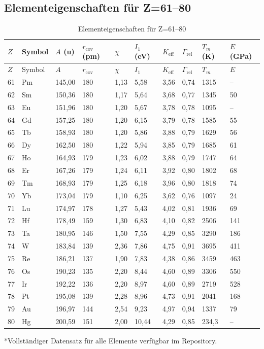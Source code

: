 \documentclass[12pt,a4paper]{article}
\newcommand{\Keff}{K_{\mathrm{eff}}}
\begin{document}
	\subsection*{Elementeigenschaften für Z=61–80}
	
	\begin{longtable}{p{0.6cm}p{1.2cm}p{1.2cm}p{1.2cm}p{1.2cm}p{1.2cm}p{1.5cm}p{1.2cm}p{1.2cm}p{1.2cm}}
		\caption{Elementeigenschaften für Z=61–80} \label{tab:elem-data-61to80} \\
		\toprule
		\(Z\) & Symbol & \(A\) (u) & \(r_{\text{cov}}\) (pm) & \(\chi\) & \(I_1\) (eV) & \(\Keff\) & \(\Gamma_{\text{rel}}\) & \(T_m\) (K) & \(E\) (GPa) \\
		\midrule
		\endfirsthead
		\toprule
		\(Z\) & Symbol & \(A\) & \(r_{\text{cov}}\) & \(\chi\) & \(I_1\) & \(\Keff\) & \(\Gamma_{\text{rel}}\) & \(T_m\) & \(E\) \\
		\midrule
		\endhead
		61 & Pm & 145,00 & 180 & 1,13 & 5,58 & 3,56 & 0,74 & 1315 & – \\
		62 & Sm & 150,36 & 180 & 1,17 & 5,64 & 3,68 & 0,77 & 1345 & 50 \\
		63 & Eu & 151,96 & 180 & 1,20 & 5,67 & 3,78 & 0,78 & 1095 & – \\
		64 & Gd & 157,25 & 180 & 1,20 & 6,15 & 3,79 & 0,78 & 1585 & 55 \\
		65 & Tb & 158,93 & 180 & 1,20 & 5,86 & 3,88 & 0,79 & 1629 & 56 \\
		66 & Dy & 162,50 & 180 & 1,22 & 5,94 & 3,85 & 0,79 & 1685 & 61 \\
		67 & Ho & 164,93 & 179 & 1,23 & 6,02 & 3,88 & 0,79 & 1747 & 64 \\
		68 & Er & 167,26 & 179 & 1,24 & 6,11 & 3,92 & 0,80 & 1802 & 68 \\
		69 & Tm & 168,93 & 179 & 1,25 & 6,18 & 3,96 & 0,80 & 1818 & 74 \\
		70 & Yb & 173,04 & 179 & 1,10 & 6,25 & 3,62 & 0,76 & 1097 & 24 \\
		71 & Lu & 174,97 & 178 & 1,27 & 5,43 & 4,02 & 0,81 & 1936 & 69 \\
		72 & Hf & 178,49 & 159 & 1,30 & 6,83 & 4,10 & 0,82 & 2506 & 141 \\
		73 & Ta & 180,95 & 146 & 1,50 & 7,55 & 4,29 & 0,85 & 3290 & 186 \\
		74 & W  & 183,84 & 139 & 2,36 & 7,86 & 4,75 & 0,91 & 3695 & 411 \\
		75 & Re & 186,21 & 137 & 1,90 & 7,83 & 4,38 & 0,86 & 3459 & 463 \\
		76 & Os & 190,23 & 135 & 2,20 & 8,44 & 4,60 & 0,89 & 3306 & 550 \\
		77 & Ir & 192,22 & 136 & 2,20 & 8,97 & 4,60 & 0,89 & 2719 & 528 \\
		78 & Pt & 195,08 & 139 & 2,28 & 8,96 & 4,73 & 0,91 & 2041 & 168 \\
		79 & Au & 196,97 & 144 & 2,54 & 9,23 & 4,97 & 0,94 & 1337 & 79 \\
		80 & Hg & 200,59 & 151 & 2,00 & 10,44 & 4,29 & 0,85 & 234,3 & – \\
		\bottomrule
	\end{longtable}
	*Vollständiger Datensatz für alle Elemente verfügbar im Repository.
	
\end{document}
